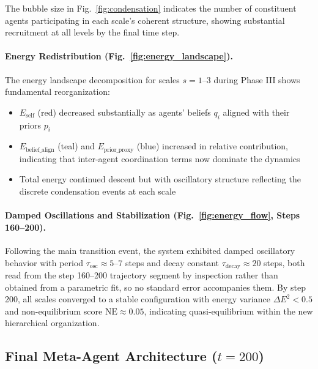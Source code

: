 \documentclass[11pt]{article}
\begin{document}
The bubble size in Fig.~\ref{fig:condensation} indicates the number of constituent agents participating in each scale's coherent structure, showing substantial recruitment at all levels by the final time step.

\paragraph{Energy Redistribution (Fig.~\ref{fig:energy_landscape}).}
The energy landscape decomposition for scales $s = 1$--3 during Phase III shows fundamental reorganization:
\begin{itemize}
\item $E_{\text{self}}$ (red) decreased substantially as agents' beliefs $q_i$ aligned with their priors $p_i$
\item $E_{\text{belief\_align}}$ (teal) and $E_{\text{prior\_proxy}}$ (blue) increased in relative contribution, indicating that inter-agent coordination terms now dominate the dynamics
\item Total energy continued descent but with oscillatory structure reflecting the discrete condensation events at each scale
\end{itemize}

\paragraph{Damped Oscillations and Stabilization (Fig.~\ref{fig:energy_flow}, Steps 160--200).}
Following the main transition event, the system exhibited damped oscillatory behavior with period $\tau_{\text{osc}} \approx 5$--7 steps and decay constant $\tau_{\text{decay}} \approx 20$ steps, both read from the step 160--200 trajectory segment by inspection rather than obtained from a parametric fit, so no standard error accompanies them. By step 200, all scales converged to a stable configuration with energy variance $\Delta E^2 < 0.5$ and non-equilibrium score $\mathrm{NE} \approx 0.05$, indicating quasi-equilibrium within the new hierarchical organization.

\subsection{Final Meta-Agent Architecture ($t = 200$)}
\end{document}
